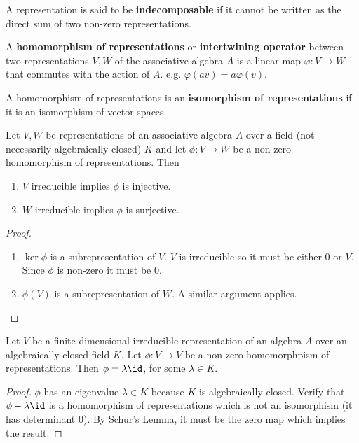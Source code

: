 \documentclass{article}
\begin{document}
\begin{df}
A representation is said to be \textbf{indecomposable} if it cannot be written
as the direct sum of two non-zero representations.
\end{df}

\begin{df}
A \textbf{homomorphism of representations} or \textbf{intertwining operator}
between two representations $V, W$ of the associative algebra $A$ is a linear
map $\varphi : V \to W$ that commutes with the action of $A$. e.g. $\varphi(av)
= a \varphi(v)$.

A homomorphism of representations is an \textbf{isomorphism of representations}
if it is an isomorphism of vector spaces.
\end{df}

\begin{prop}
Let $V, W$ be representations of an associative algebra $A$ over a field (not
necessarily algebraically closed) $K$ and let $\phi : V \to W$ be a non-zero
homomorphism of representations. Then
\begin{enumerate}
\item
$V$ irreducible implies $\phi$ is injective.
\item
$W$ irreducible implies $\phi$ is surjective.
\end{enumerate}
\end{prop}

\begin{proof}
$ $
\begin{enumerate}
\item
$\ker \phi$ is a subrepresentation of $V$. $V$ is irreducible so it must be
either $0$ or $V$. Since $\phi$ is non-zero it must be $0$.
\item
$\phi(V)$ is a subrepresentation of $W$. A similar argument applies.
\end{enumerate}
\end{proof}

\begin{cor}
Let $V$ be a finite dimensional irreducible representation of an algebra $A$
over an algebraically closed field $K$. Let $\phi : V \to V$ be a non-zero
homomorphpism of representations. Then $\phi = \lambda \id$, for some $\lambda
\in K$.
\end{cor}

\begin{proof}
$\phi$ has an eigenvalue $\lambda \in K$ because $K$ is algebraically closed.
Verify that $\phi - \lambda \id$ is a homomorphism of representations which is
not an isomorphism (it has determinant $0$). By Schur's Lemma, it must be the
zero map which implies the result.
\end{proof}
\end{document}
